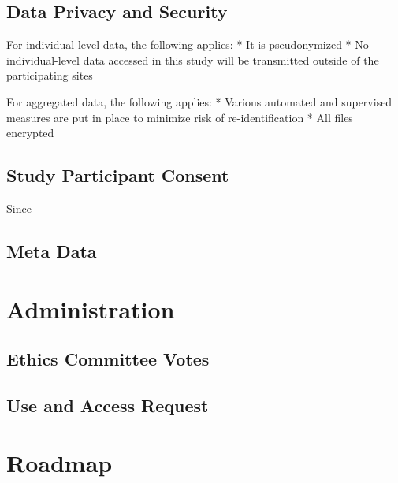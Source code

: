 \documentclass[
  letterpaper,
  DIV=11,
  numbers=noendperiod]{scrreprt}
\begin{document}
\hypertarget{data-privacy-and-security}{%
\section{Data Privacy and Security}\label{data-privacy-and-security}}

For individual-level data, the following applies: * It is pseudonymized
* No individual-level data accessed in this study will be transmitted
outside of the participating sites

For aggregated data, the following applies: * Various automated and
supervised measures are put in place to minimize risk of
re-identification * All files encrypted

\hypertarget{study-participant-consent}{%
\section{Study Participant Consent}\label{study-participant-consent}}

Since

\hypertarget{meta-data}{%
\section{Meta Data}\label{meta-data}}

\hypertarget{administration}{%
\chapter{Administration}\label{administration}}

\hypertarget{ethics-committee-votes}{%
\section{Ethics Committee Votes}\label{ethics-committee-votes}}

\hypertarget{use-and-access-request}{%
\section{Use and Access Request}\label{use-and-access-request}}

\hypertarget{roadmap}{%
\chapter{Roadmap}\label{roadmap}}
\end{document}
